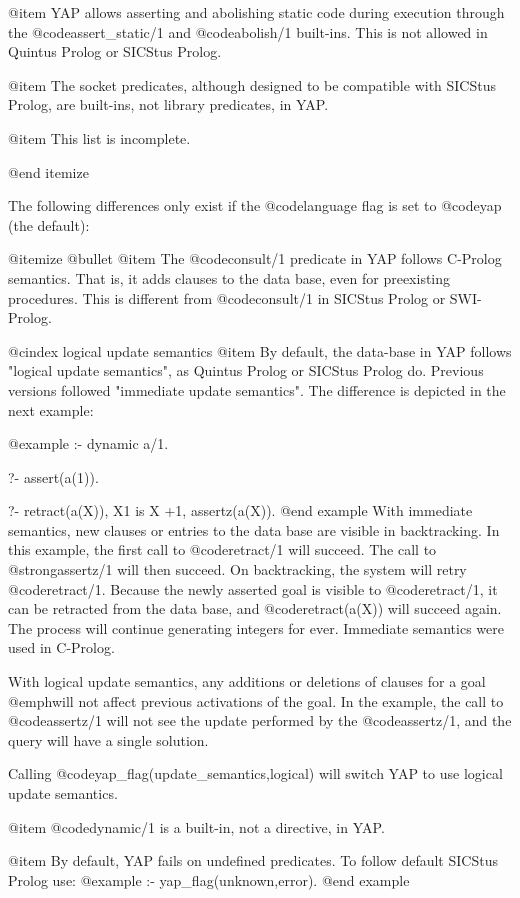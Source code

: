 @item YAP allows asserting and abolishing static code during
execution through the @code{assert_static/1} and @code{abolish/1}
built-ins. This is not allowed in Quintus Prolog or SICStus Prolog.

@item The socket predicates, although designed to be compatible with
SICStus Prolog, are built-ins, not library predicates, in YAP.

@item This list is incomplete.

@end itemize

The following differences only exist if the @code{language} flag is set
to @code{yap} (the default):

@itemize @bullet
@item The @code{consult/1} predicate in YAP follows C-Prolog
semantics. That is, it adds clauses to the data base, even for
preexisting procedures. This is different from @code{consult/1} in
SICStus Prolog or SWI-Prolog.

@cindex logical update semantics
@item 
By default, the data-base in YAP follows "logical update semantics", as
Quintus Prolog or SICStus Prolog do.  Previous versions followed
"immediate update semantics". The difference is depicted in the next
example:

@example
:- dynamic a/1.

?- assert(a(1)).

?- retract(a(X)), X1 is X +1, assertz(a(X)).
@end example
With immediate semantics, new clauses or entries to the data base are
visible in backtracking. In this example, the first call to
@code{retract/1} will succeed. The call to @strong{assertz/1} will then
succeed. On backtracking, the system will retry
@code{retract/1}. Because the newly asserted goal is visible to
@code{retract/1}, it can be retracted from the data base, and
@code{retract(a(X))} will succeed again. The process will continue
generating integers for ever. Immediate semantics were used in C-Prolog.

With logical update semantics, any additions or deletions of clauses
for a goal 
@emph{will not affect previous activations of the goal}. In the example,
the call to @code{assertz/1} will not see the 
update performed by the @code{assertz/1}, and the query will have a
single solution.

Calling @code{yap_flag(update_semantics,logical)} will switch
YAP to use logical update semantics.

@item @code{dynamic/1} is a built-in, not a directive, in YAP.

@item By default, YAP fails on undefined predicates. To follow default
SICStus Prolog use:
@example
:- yap_flag(unknown,error).
@end example

